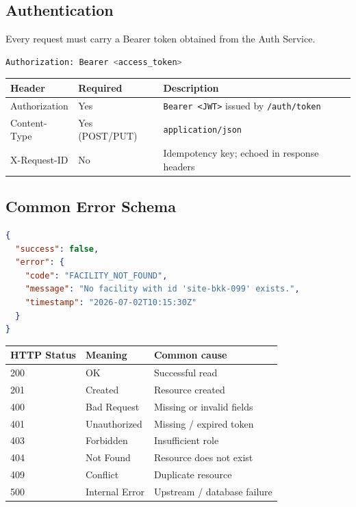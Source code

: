 \documentclass{article}
\begin{document}
\subsection{Authentication}

Every request must carry a Bearer token obtained from the Auth Service.

\begin{lstlisting}[language=bash, caption=Authorization header]
Authorization: Bearer <access_token>
\end{lstlisting}

\begin{center}
\begin{tabular}{>{\ttfamily}lll}
\toprule
\textbf{Header} & \textbf{Required} & \textbf{Description}\\
\midrule
Authorization & Yes & \texttt{Bearer <JWT>} issued by \texttt{/auth/token}\\
Content-Type  & Yes (POST/PUT) & \texttt{application/json}\\
X-Request-ID  & No  & Idempotency key; echoed in response headers\\
\bottomrule
\end{tabular}
\end{center}

\subsection{Common Error Schema}

\begin{lstlisting}[language=json, caption=Error response envelope]
{
  "success": false,
  "error": {
    "code": "FACILITY_NOT_FOUND",
    "message": "No facility with id 'site-bkk-099' exists.",
    "timestamp": "2026-07-02T10:15:30Z"
  }
}
\end{lstlisting}

\begin{center}
\begin{tabular}{lll}
\toprule
\textbf{HTTP Status} & \textbf{Meaning} & \textbf{Common cause}\\
\midrule
200 & OK & Successful read\\
201 & Created & Resource created\\
400 & Bad Request & Missing or invalid fields\\
401 & Unauthorized & Missing / expired token\\
403 & Forbidden & Insufficient role\\
404 & Not Found & Resource does not exist\\
409 & Conflict & Duplicate resource\\
500 & Internal Error & Upstream / database failure\\
\bottomrule
\end{tabular}
\end{center}
\end{document}
